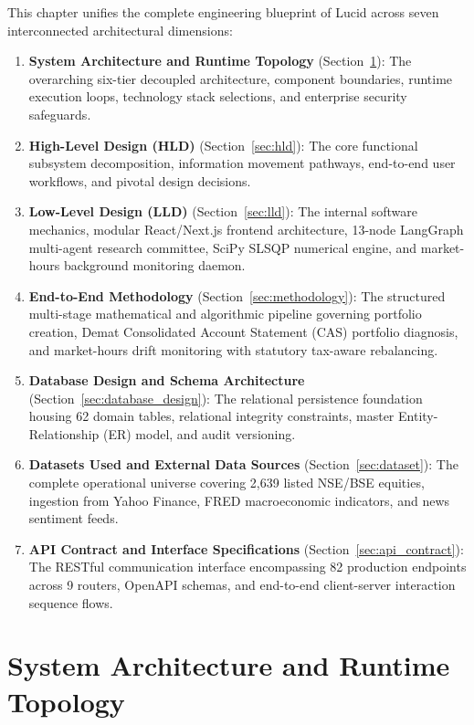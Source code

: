This chapter unifies the complete engineering blueprint of Lucid across seven interconnected architectural dimensions:
\begin{enumerate}
    \item \textbf{System Architecture and Runtime Topology} (Section~\ref{sec:system_arch}): The overarching six-tier decoupled architecture, component boundaries, runtime execution loops, technology stack selections, and enterprise security safeguards.
    \item \textbf{High-Level Design (HLD)} (Section~\ref{sec:hld}): The core functional subsystem decomposition, information movement pathways, end-to-end user workflows, and pivotal design decisions.
    \item \textbf{Low-Level Design (LLD)} (Section~\ref{sec:lld}): The internal software mechanics, modular React/Next.js frontend architecture, 13-node LangGraph multi-agent research committee, SciPy SLSQP numerical engine, and market-hours background monitoring daemon.
    \item \textbf{End-to-End Methodology} (Section~\ref{sec:methodology}): The structured multi-stage mathematical and algorithmic pipeline governing portfolio creation, Demat Consolidated Account Statement (CAS) portfolio diagnosis, and market-hours drift monitoring with statutory tax-aware rebalancing.
    \item \textbf{Database Design and Schema Architecture} (Section~\ref{sec:database_design}): The relational persistence foundation housing 62 domain tables, relational integrity constraints, master Entity-Relationship (ER) model, and audit versioning.
    \item \textbf{Datasets Used and External Data Sources} (Section~\ref{sec:dataset}): The complete operational universe covering 2,639 listed NSE/BSE equities, ingestion from Yahoo Finance, FRED macroeconomic indicators, and news sentiment feeds.
    \item \textbf{API Contract and Interface Specifications} (Section~\ref{sec:api_contract}): The RESTful communication interface encompassing 82 production endpoints across 9 routers, OpenAPI schemas, and end-to-end client-server interaction sequence flows.
\end{enumerate}


\section{System Architecture and Runtime Topology}
\label{sec:system_arch}
\label{ch:system_arch}

